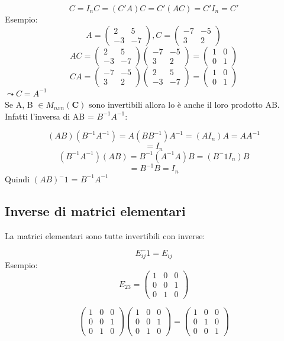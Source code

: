 \documentclass[12pt]{article}
\begin{document}
\[C = I_nC = (C'A)C = C'(AC) = C'I_n = C'\]
Esempio:
\[A = \begin{pmatrix}
    2 & 5\\
    -3 & -7
\end{pmatrix}, C = \begin{pmatrix}
    -7 & -5\\
    3 & 2
\end{pmatrix}\]
\[AC = \begin{pmatrix}
    2 & 5\\
    -3 & -7
\end{pmatrix}
\begin{pmatrix}
    -7 & -5\\
    3 & 2
\end{pmatrix}
=
\begin{pmatrix}
    1 & 0\\
    0 & 1
\end{pmatrix}
\]
\[CA = \begin{pmatrix}
    -7 & -5\\
    3 & 2
\end{pmatrix}
\begin{pmatrix}
    2 & 5\\
    -3 & -7
\end{pmatrix} =
\begin{pmatrix}
    1 & 0\\
    0 & 1
\end{pmatrix}
\]
$\leadsto C = A^{-1}$\\
Se A, B $\in M_{nxn} (\mathbf{C})$ sono invertibili allora lo è anche il loro prodotto AB. Infatti l'inversa di AB = $B^{-1}A^{-1}:$

\[(AB)(B^{-1}A^{-1}) = A(BB^{-1})A^{-1} = (AI_n)A = AA^{-1} \]
\[= I_n\]
\[(B^{-1}A^{-1})(AB) = B^{-1}(A^{-1}A)B = (B^-1I_n)B\]
\[= B^{-1}B = I_n\]
Quindi $(AB)^-1$ = $B^{-1}A^{-1}$

\subsection{Inverse di matrici elementari}
La matrici elementari sono tutte invertibili con inverse:

\[E_{ij}^-1 = E_{ij}\]
Esempio:
\[E_{23} = \begin{pmatrix}
    1 & 0 & 0\\
    0 & 0 & 1\\
    0 & 1 & 0
\end{pmatrix}\]

\[\begin{pmatrix}
    1 & 0 & 0\\
    0 & 0 & 1\\
    0 & 1 & 0
\end{pmatrix}
\begin{pmatrix}
    1 & 0 & 0\\
    0 & 0 & 1\\
    0 & 1 & 0
\end{pmatrix} = \begin{pmatrix}
    1 & 0 & 0\\
    0 & 1 & 0\\
    0 & 0 & 1
\end{pmatrix}\]
\end{document}
